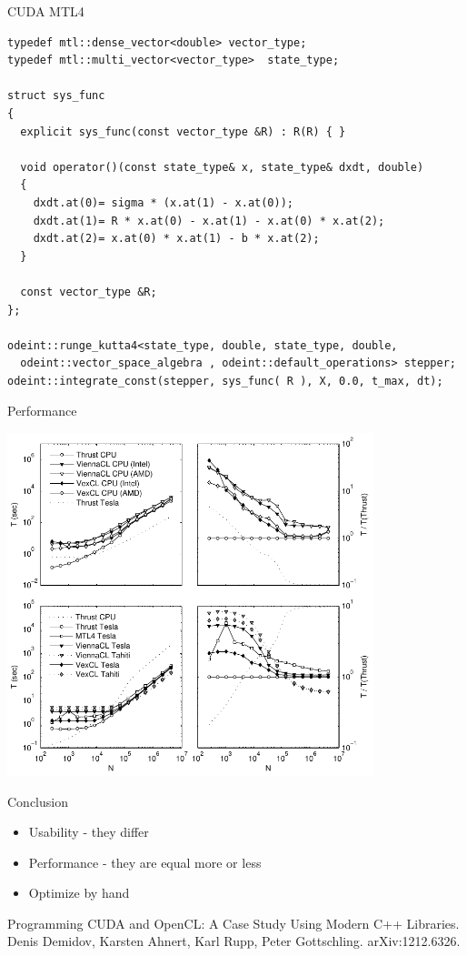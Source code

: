 \documentclass{beamer}
\newcommand{\rem}[1]{}
\newcommand{\heading}[1]{\centerline{\Large #1} \vspace{0.5em}}
\begin{document}
\begin{frame}[fragile]
 \heading{CUDA MTL4}

\begin{lstlisting}[basicstyle=\tiny\ttfamily]
typedef mtl::dense_vector<double> vector_type;
typedef mtl::multi_vector<vector_type>  state_type;

struct sys_func
{
  explicit sys_func(const vector_type &R) : R(R) { }

  void operator()(const state_type& x, state_type& dxdt, double)
  {
    dxdt.at(0)= sigma * (x.at(1) - x.at(0));
    dxdt.at(1)= R * x.at(0) - x.at(1) - x.at(0) * x.at(2);
    dxdt.at(2)= x.at(0) * x.at(1) - b * x.at(2);
  }

  const vector_type &R;
};

odeint::runge_kutta4<state_type, double, state_type, double,
  odeint::vector_space_algebra , odeint::default_operations> stepper;
odeint::integrate_const(stepper, sys_func( R ), X, 0.0, t_max, dt);
\end{lstlisting}

\end{frame}


\begin{frame}[fragile]
 \heading{Performance}

 \centerline{\includegraphics[draft=false,width=0.8\textwidth]{lorenz_perf.pdf}}

\end{frame}

\begin{frame}[fragile]
 \heading{Conclusion}

 \begin{itemize}
  \item Usability - they differ
  \item Performance - they are equal more or less
  \item Optimize by hand
 \end{itemize}

 Programming CUDA and OpenCL: A Case Study Using Modern C++ Libraries. Denis Demidov, Karsten Ahnert, Karl Rupp, Peter Gottschling. arXiv:1212.6326.

\end{frame}





\rem{




%



%
}
\end{document}
